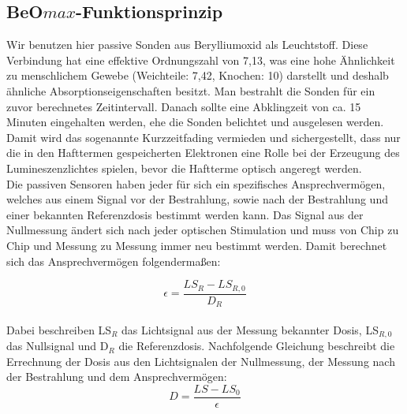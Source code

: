 \subsection{BeO$max$-Funktionsprinzip}
Wir benutzen hier passive Sonden aus Berylliumoxid als Leuchtstoff. Diese Verbindung hat eine effektive Ordnungszahl von 7,13, was eine hohe Ähnlichkeit zu menschlichem Gewebe (Weichteile: 7,42, Knochen: 10) darstellt und deshalb ähnliche Absorptionseigenschaften besitzt.
Man bestrahlt die Sonden für ein zuvor berechnetes Zeitintervall. Danach sollte eine Abklingzeit von ca. 15 Minuten eingehalten werden, ehe die Sonden belichtet und ausgelesen werden. Damit wird das sogenannte Kurzzeitfading vermieden und sichergestellt, dass nur die in den Hafttermen gespeicherten Elektronen eine Rolle bei der Erzeugung des Lumineszenzlichtes spielen, bevor die Haftterme optisch angeregt werden.\\
Die passiven Sensoren haben jeder für sich ein spezifisches Ansprechvermögen, welches aus einem Signal vor der Bestrahlung, sowie nach der Bestrahlung und einer bekannten Referenzdosis bestimmt werden kann. Das Signal aus der Nullmessung ändert sich nach jeder optischen Stimulation und muss von Chip zu Chip und Messung zu Messung immer neu bestimmt werden. Damit berechnet sich das Ansprechvermögen folgendermaßen:

\begin{equation} \label{eq:ansprechvermoegen}
    \epsilon = \frac{LS_R - LS_{R,0}}{D_R}
\end{equation}
\ \\
Dabei beschreiben LS$_R$ das Lichtsignal aus der Messung bekannter Dosis, LS$_{R,0}$ das Nullsignal und D$_R$ die Referenzdosis.
Nachfolgende Gleichung beschreibt die Errechnung der Dosis aus den Lichtsignalen der Nullmessung, der Messung nach der Bestrahlung und dem Ansprechvermögen: \cite{PA_alt}
\begin{equation}
    D = \frac{LS - LS_0}{\epsilon}
\end{equation}